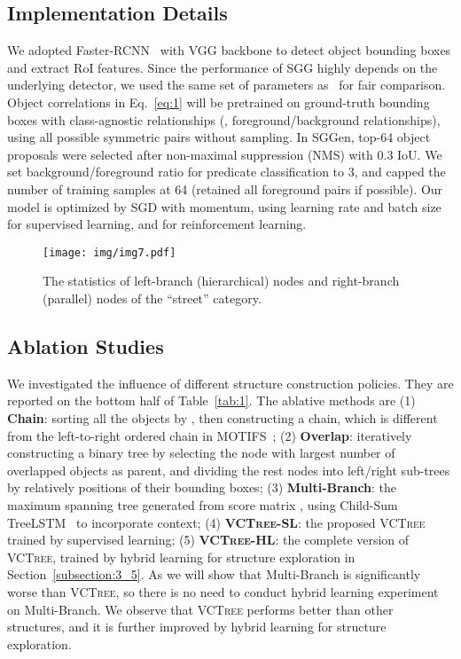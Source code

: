 \documentclass[10pt,twocolumn,letterpaper]{article}
\begin{document}
\subsection{Implementation Details}
We adopted Faster-RCNN~\cite{ren2015faster} with VGG backbone to detect object bounding boxes and extract RoI features. Since the performance of SGG highly depends on the underlying detector, we used the same set of parameters as~\cite{zellers2017neural} for fair comparison. Object correlations  in Eq.~\eqref{eq:1} will be pretrained on ground-truth bounding boxes with class-agnostic relationships (\ie, foreground/background relationships), using all possible symmetric pairs without sampling. In SGGen, top-64 object proposals were selected after non-maximal suppression (NMS) with 0.3 IoU. We set background/foreground ratio for predicate classification to 3, and capped the number of training samples at 64 (retained all foreground pairs if possible). Our model is optimized by SGD with momentum, using learning rate  and batch size  for supervised learning, and  for reinforcement learning. 

\begin{figure}
   \begin{minipage}[b]{1.0\linewidth}
   \centerline{\texttt{[image: img/img7.pdf]}}
   \end{minipage}
   \caption{The statistics of left-branch (hierarchical) nodes and right-branch (parallel) nodes of the ``street'' category.}
   \vspace{-0.1in}
   \label{fig:6} \end{figure}

\subsection{Ablation Studies}
\label{subsection:4_4}
We investigated the influence of different structure construction policies. They are reported on the bottom half of Table~\ref{tab:1}. The ablative methods are (1) \textbf{Chain}: sorting all the objects by , then constructing a chain, which is different from the left-to-right ordered chain in MOTIFS~\cite{zellers2017neural}; (2) \textbf{Overlap}: iteratively constructing a binary tree by selecting the node with largest number of overlapped objects as parent, and dividing the rest nodes into left/right sub-trees by relatively positions of their bounding boxes; (3) \textbf{Multi-Branch}: the maximum spanning tree generated from score matrix , using Child-Sum TreeLSTM~\cite{tai2015improved} to incorporate context; (4) \textbf{\textsc{VCTree}-SL}: the proposed \textsc{VCTree} trained by supervised learning; (5) \textbf{\textsc{VCTree}-HL}: the complete version of \textsc{VCTree}, trained by hybrid learning for structure exploration in Section~\ref{subsection:3_5}. As we will show that Multi-Branch is significantly worse than \textsc{VCTree}, so there is no need to conduct hybrid learning experiment on Multi-Branch. We observe that \textsc{VCTree} performs better than other structures, and it is further improved by hybrid learning for structure exploration.
\end{document}
